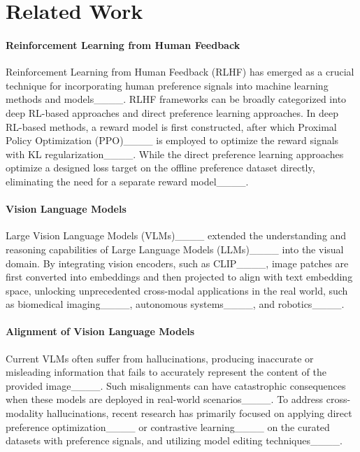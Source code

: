 \section{Related Work}
\paragraph{Reinforcement Learning from Human Feedback} 
Reinforcement Learning from Human Feedback (RLHF) has emerged as a crucial technique for incorporating human preference signals into machine learning methods and models____. RLHF frameworks can be broadly categorized into deep RL-based approaches and direct preference learning approaches. In deep RL-based methods, a reward model is first constructed, after which Proximal Policy Optimization (PPO)____ is employed to optimize the reward signals with KL regularization____. While the direct preference learning approaches optimize a designed loss target on the offline preference dataset directly, eliminating the need for a separate reward model____.

\paragraph{Vision Language Models} 
Large Vision Language Models (VLMs)____ extended the understanding and reasoning capabilities of Large Language Models (LLMs)____ into the visual domain. By integrating vision encoders, such as CLIP____, image patches are first converted into embeddings and then projected to align with text embedding space, unlocking unprecedented cross-modal applications in the real world, such as biomedical imaging____, autonomous systems____, and robotics____.

\paragraph{Alignment of Vision Language Models}
Current VLMs often suffer from hallucinations, producing inaccurate or misleading information that fails to accurately represent the content of the provided image____. Such misalignments can have catastrophic consequences when these models are deployed in real-world scenarios____.
To address cross-modality hallucinations, recent research has primarily focused on applying direct preference optimization____ or contrastive learning____ on the curated datasets with preference signals, and utilizing model editing techniques____.